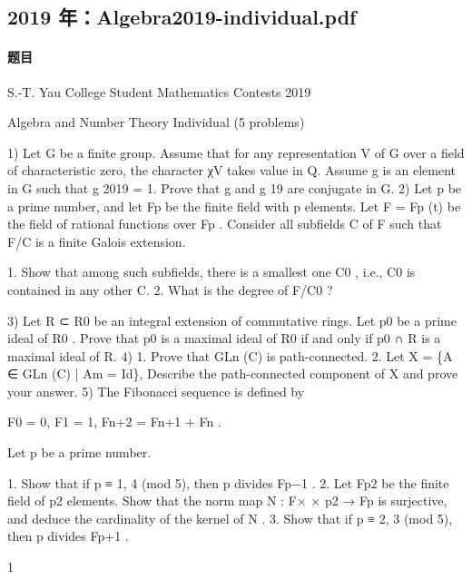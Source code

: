 \documentclass[UTF8,12pt]{ctexart}
\begin{document}
\subsection{2019 年：Algebra2019-individual.pdf}
\paragraph{题目}
S.-T. Yau College Student Mathematics Contests 2019

Algebra and Number Theory Individual (5 problems)

1) Let G be a finite group. Assume that for any representation V of G over a field of characteristic zero, the character χV takes value in Q. Assume g is an element in G such that g 2019 = 1. Prove that g and g 19 are conjugate in G. 2) Let p be a prime number, and let Fp be the finite field with p elements. Let F = Fp (t) be the field of rational functions over Fp . Consider all subfields C of F such that F/C is a finite Galois extension.

1. Show that among such subfields, there is a smallest one C0 , i.e., C0 is contained in any other C. 2. What is the degree of F/C0 ?

3) Let R ⊂ R0 be an integral extension of commutative rings. Let p0 be a prime ideal of R0 . Prove that p0 is a maximal ideal of R0 if and only if p0 ∩ R is a maximal ideal of R. 4) 1. Prove that GLn (C) is path-connected. 2. Let X = \{A ∈ GLn (C) | Am = Id\}, Describe the path-connected component of X and prove your answer. 5) The Fibonacci sequence is defined by

F0 = 0, F1 = 1, Fn+2 = Fn+1 + Fn .

Let p be a prime number.

1. Show that if p ≡ 1, 4 (mod 5), then p divides Fp−1 . 2. Let Fp2 be the finite field of p2 elements. Show that the norm map N : F× × p2 → Fp is surjective, and deduce the cardinality of the kernel of N . 3. Show that if p ≡ 2, 3 (mod 5), then p divides Fp+1 .

1
\end{document}
